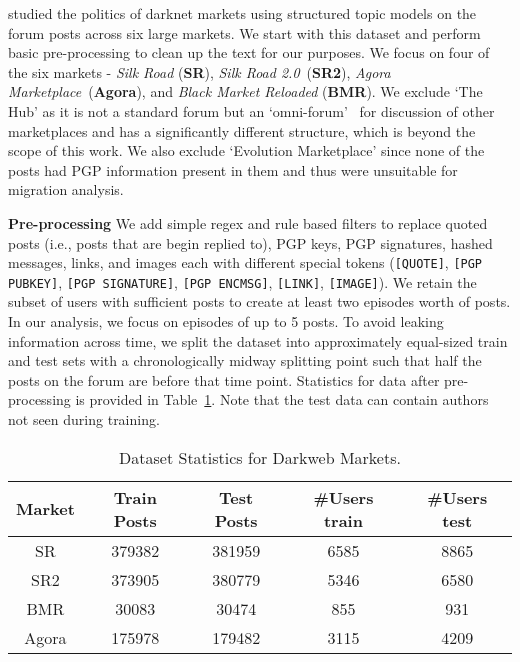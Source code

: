 \label{sec:sysml:dataset}
\noindent \citet{munksgaard2016mixing} studied the politics of darknet markets using structured topic models on the forum posts across six  large markets.
We start with this dataset and perform basic pre-processing to clean up the text for our purposes. We focus on four of the six markets - \textit{Silk Road} (\textbf{SR}), \textit{Silk Road 2.0}~({\textbf{SR2}}), \textit{Agora Marketplace}~(\textbf{Agora}), and \textit{Black Market Reloaded} (\textbf{BMR}). 
We exclude `The Hub'  as it is not a standard forum but an `omni-forum'~\cite{munksgaard2016mixing} for discussion of other marketplaces and has a significantly different structure, which is beyond the scope of this work.
We also exclude `Evolution Marketplace' since none of the posts had PGP information present in them and thus were unsuitable for migration analysis.

\noindent \textbf{Pre-processing}
We add simple regex and rule based filters to replace quoted posts (i.e., posts that are begin replied to), PGP keys, PGP signatures, hashed messages, links, and images each with different special tokens (\texttt{[QUOTE]}, \texttt{[PGP PUBKEY]}, \texttt{[PGP SIGNATURE]}, \texttt{[PGP ENCMSG]}, \texttt{[LINK]}, \texttt{[IMAGE]}).
We retain the subset of users with sufficient posts to create at least two episodes worth of posts. In our analysis, we focus on episodes of up to 5 posts. %
To avoid leaking information across time, we split the dataset into approximately equal-sized train and test sets with a chronologically midway splitting point such that half the posts on the forum are before that time point.
Statistics for data after pre-processing is provided in Table~\ref{tab:dataset_stats}. Note that the test data can contain authors not seen during training.

\begin{table}[htbp]
    \centering
    \begin{tabular}{ccccc}
    \toprule
         Market &  Train Posts & Test Posts & \#Users train & \#Users test \\
    \midrule
         SR & 379382 & 381959 & 6585 & 8865\\
         SR2 & 373905 & 380779 &  5346 & 6580 \\
         BMR & 30083 &30474 & 855 & 931\\
         Agora & 175978 & 179482 & 3115 & 4209\\
    \bottomrule
    \end{tabular}
    \caption{Dataset Statistics for Darkweb Markets.}
    \label{tab:dataset_stats}
\end{table}


